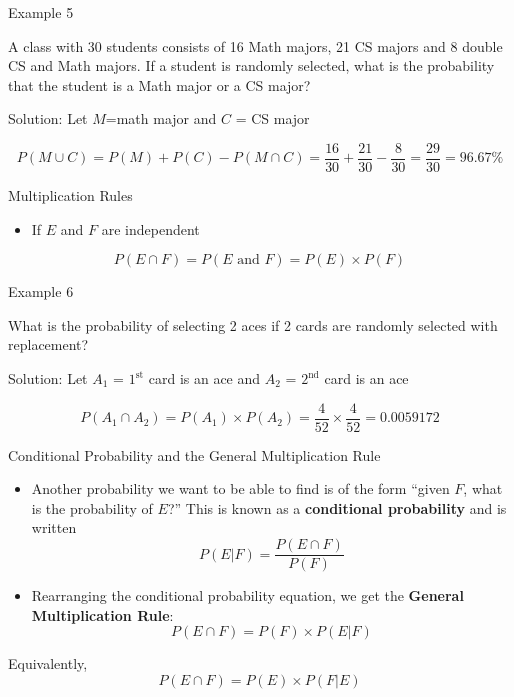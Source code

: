 \documentclass[
  ignorenonframetext,
]{beamer}
\providecommand{\tightlist}{%
  \setlength{\itemsep}{0pt}\setlength{\parskip}{0pt}}
\begin{document}
\begin{frame}{Example 5}
\protect\hypertarget{example-5}{}
\begin{tcolorbox}
A class with 30 students consists of 16 Math majors, 21 CS majors and 8 double CS and Math majors. If a student is randomly selected, what is the probability that the student is a Math major or a CS major?
\end{tcolorbox}

\begin{tcolorbox}
Solution:
Let $M$=math major and $C$ = CS major

$$P(M \cup C) = P(M)+P(C)-P(M \cap C) = \frac{16}{30}+\frac{21}{30}-\frac{8}{30} = \frac{29}{30}=96.67\%$$
\end{tcolorbox}
\end{frame}

\begin{frame}{Multiplication Rules}
\protect\hypertarget{multiplication-rules}{}
\begin{itemize}
\tightlist
\item
  If \(E\) and \(F\) are independent
\end{itemize}

\[P(E \cap F) =P(E \text{ and } F)= P(E)\times P(F)\]
\end{frame}

\begin{frame}{Example 6}
\protect\hypertarget{example-6}{}
\begin{tcolorbox}
What is the probability of selecting 2 aces if 2 cards are randomly selected with replacement?
\end{tcolorbox}

\begin{tcolorbox}
Solution:
Let $A_1$ = $1^{\text{st}}$ card is an ace and $A_2$ = $2^{\text{nd}}$ card is an ace

$$P(A_1 \cap A_2) = P(A_1)\times P(A_2) = \frac{4}{52}\times\frac{4}{52} = 0.0059172$$
\end{tcolorbox}
\end{frame}

\begin{frame}{Conditional Probability and the General Multiplication
Rule}
\protect\hypertarget{conditional-probability-and-the-general-multiplication-rule}{}
\begin{itemize}
\item
  Another probability we want to be able to find is of the form ``given
  \(F\), what is the probability of \(E\)?'' This is known as a
  \textbf{conditional probability} and is written
  \[P(E | F)=\frac{P( E \cap  F)}{P( F)}\]
\item
  Rearranging the conditional probability equation, we get the
  \textbf{General Multiplication Rule}:
  \[P(E \cap F)=P( F)\times P(E| F)\]
\end{itemize}

Equivalently, \[P(E \cap F)=P( E)\times P(F|E)\]
\end{frame}
\end{document}
